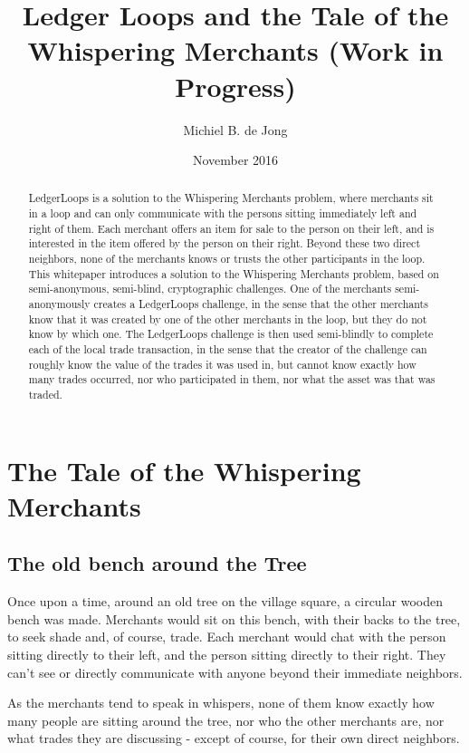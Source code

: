 \documentclass[11pt,twoside,a4paper]{article}
\begin{document}
\title{Ledger Loops and the Tale of the Whispering Merchants (Work in Progress)}
\author{Michiel B. de Jong}
\date{November 2016}
\maketitle
\begin{abstract}
LedgerLoops is a solution to the Whispering Merchants problem, where merchants sit in a loop and can only communicate with the persons sitting immediately left and right of them. Each merchant offers an item for sale to the person on their left, and is interested in the item offered by the person on their right. Beyond these two direct neighbors, none of the merchants knows or trusts the other participants in the loop.
This whitepaper introduces a solution to the Whispering Merchants problem, based on semi-anonymous, semi-blind, cryptographic challenges.
One of the merchants semi-anonymously creates a LedgerLoops challenge, in the sense that the other merchants know that it was created by one of the other merchants in the loop, but they do not know by which one.
The LedgerLoops challenge is then used semi-blindly to complete each of the local trade transaction, in the sense that the creator of the challenge can roughly know the value of the trades it was used in, but cannot know exactly how many trades occurred, nor who participated in them, nor what the asset was that was traded.
\end{abstract}
\section{The Tale of the Whispering Merchants}
\subsection{The old bench around the Tree}
Once upon a time, around an old tree on the village square, a circular wooden bench was made. Merchants would sit on this bench, with their backs to the tree, to seek shade and, of course, trade.
Each merchant would chat with the person sitting directly to their left, and the person sitting directly to their right. They can't see or directly communicate with anyone beyond their immediate neighbors.

As the merchants tend to speak in whispers, none of them know exactly how many people are sitting around the tree, nor who the other merchants are, nor what trades they are discussing - except of course, for their own direct neighbors.
\end{document}
